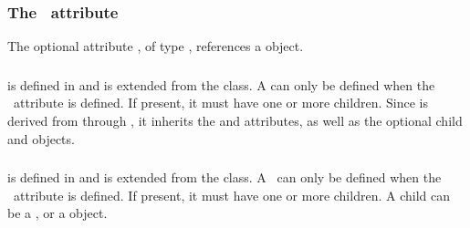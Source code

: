 \subsubsection{The \speciesTypeAtt\ attribute}
\label{def:Species:speciesType}

The optional attribute \speciesTypeAtt, of type \SIdRefPT, references a \SpeciesType object. 
 
\subsubsection{}
\label{def:ListOfOutwardBindingSites}

 is defined in  and is extended from the  class. A  can only be defined when the \speciesTypeAtt\ attribute is defined. If present, it must have one or more \OutwardBindingSite children.  Since  is derived from  through , it inherits the  and  attributes, as well as the optional \mBlockChangedBegin{\revTwentyTwentyMarch}child\mBlockChangedEnd{\revTwentyTwentyMarch}  and  objects. 


\label{note:outwardBindingSite:dontcare}

\subsubsection{}
\label{def:ListOfSpeciesFeatures}

 is defined in  and is extended from the  class. A \listOfSpeciesFeatures\ can only be defined when the \speciesTypeAtt\ attribute is defined. If present, it must have one or more children. A child can be a \SpeciesFeature, or a \SubListOfSpeciesFeatures object.   


